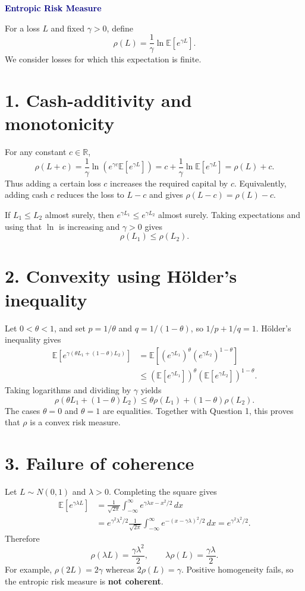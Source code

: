 \documentclass[10pt,letterpaper]{article}
\begin{document}
\setlength{\abovedisplayskip}{7pt}
\setlength{\belowdisplayskip}{7pt}
\setlength{\abovedisplayshortskip}{4pt}
\setlength{\belowdisplayshortskip}{5pt}
{\LARGE\bfseries\textcolor{navy}{Entropic Risk Measure}}

For a loss $L$ and fixed $\gamma>0$, define
\[
\rho(L)=\frac{1}{\gamma}\ln\mathbb E[e^{\gamma L}].
\]
We consider losses for which this expectation is finite.

\section*{1. Cash-additivity and monotonicity}
For any constant $c\in\mathbb R$,
\[
\rho(L+c)=\frac{1}{\gamma}\ln\left(e^{\gamma c}\mathbb E[e^{\gamma L}]\right)
=c+\frac{1}{\gamma}\ln\mathbb E[e^{\gamma L}]
=\boxed{\rho(L)+c.}
\]
Thus adding a certain loss $c$ increases the required capital by $c$.
Equivalently, adding cash $c$ reduces the loss to $L-c$ and gives
$\rho(L-c)=\rho(L)-c$.

If $L_1\le L_2$ almost surely, then $e^{\gamma L_1}\le e^{\gamma L_2}$ almost surely.
Taking expectations and using that $\ln$ is increasing and $\gamma>0$ gives
\[
\boxed{\rho(L_1)\le\rho(L_2).}
\]

\section*{2. Convexity using H\"older's inequality}
Let $0<\theta<1$, and set $p=1/\theta$ and $q=1/(1-\theta)$, so
$1/p+1/q=1$. H\"older's inequality gives
\begin{align*}
\mathbb E\!\left[e^{\gamma(\theta L_1+(1-\theta)L_2)}\right]
&=\mathbb E\!\left[(e^{\gamma L_1})^\theta
                         (e^{\gamma L_2})^{1-\theta}\right]\\
&\le\left(\mathbb E[e^{\gamma L_1}]\right)^\theta
      \left(\mathbb E[e^{\gamma L_2}]\right)^{1-\theta}.
\end{align*}
Taking logarithms and dividing by $\gamma$ yields
\[
\boxed{\rho(\theta L_1+(1-\theta)L_2)
\le\theta\rho(L_1)+(1-\theta)\rho(L_2).}
\]
The cases $\theta=0$ and $\theta=1$ are equalities. Together with Question 1,
this proves that $\rho$ is a convex risk measure.

\section*{3. Failure of coherence}
Let $L\sim N(0,1)$ and $\lambda>0$. Completing the square gives
\begin{align*}
\mathbb E[e^{\gamma\lambda L}]
&=\frac{1}{\sqrt{2\pi}}\int_{-\infty}^{\infty}
       e^{\gamma\lambda x-x^2/2}\,dx\\
&=e^{\gamma^2\lambda^2/2}\frac{1}{\sqrt{2\pi}}
  \int_{-\infty}^{\infty}e^{-(x-\gamma\lambda)^2/2}\,dx
=e^{\gamma^2\lambda^2/2}.
\end{align*}
Therefore
\[
\boxed{\rho(\lambda L)=\frac{\gamma\lambda^2}{2},}
\qquad
\lambda\rho(L)=\frac{\gamma\lambda}{2}.
\]
For example, $\rho(2L)=2\gamma$ whereas $2\rho(L)=\gamma$.
Positive homogeneity fails, so the entropic risk measure is \textbf{not coherent}.
\end{document}

